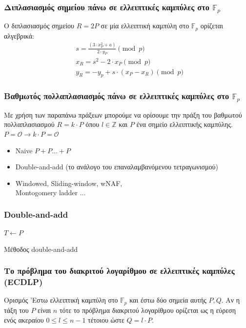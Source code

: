 \documentclass{beamer}
\begin{document}
%
\begin{frame}
\frametitle{Διπλασιασμός σημείου πάνω σε ελλειπτικές καμπύλες στο $\mathbb{F}_p$}
Ο διπλασιασμός σημείου $R = 2P$ σε μία ελλειπτική καμπύλη στο $\mathbb{F}_p$ ορίζεται αλγεβρικά:
 \begin{align*}
  & s = \frac{(3 \cdot x^2_P + a)}{2 \cdot y_P} \pmod p \\
  & x_R = s^2 - 2 \cdot x _P \pmod p \\
  & y_R = -y_p + s \cdot (x_P - x_R) \pmod p
 \end{align*}
\end{frame}

%
\begin{frame}
\frametitle{Βαθμωτός πολλαπλασιασμός πάνω σε ελλειπτικές καμπύλες στο $\mathbb{F}_p$}
Με χρήση των παραπάνω πράξεων μπορούμε να ορίσουμε την πράξη του βαθμωτού πολλαπλασιασμού $R = k \cdot P$ όπου $l \in \mathbb{Z}$ και $P$ ένα σημείο ελλειπτικής καμπύλης.
$P = \mathcal{O} \rightarrow k \cdot P = \mathcal{O}$
\begin{itemize}
\item Naive $P + P  \ldots + P$
\item Double-and-add (το ανάλογο του επαναλαμβανόμενου τετραγωνισμού)
\item Windowed, Sliding-window, wNAF, \\ Montogomery ladder $\ldots$ \cite{BERN}
\end{itemize}
\end{frame}

%
\begin{frame}
\frametitle{Double-and-add}
\begin{algorithm}[H]
\SetAlgoNoLine 
 $T \leftarrow P$ \\
\caption{Μέθοδος double-and-add}
\end{algorithm}
\end{frame}

%
\begin{frame}
\frametitle{Το πρόβλημα του διακριτού λογαρίθμου σε ελλειπτικές καμπύλες (ECDLP)}
\begin{block}
{Ορισμός}
'Εστω ελλειπτική καμπύλη  στο $\mathbb{F}_p$ και έστω δύο σημεία αυτής $P,Q$. Αν η τάξη του $P$ είναι $n$ τότε το πρόβλημα διακριτού λογαρίθμου ορίζεται ως η εύρεση ενός ακεραίου $ 0 \leq l \leq n -1$ τέτοιου ώστε $Q = l \cdot P$.
\end{block}
\end{frame}
\end{document}
